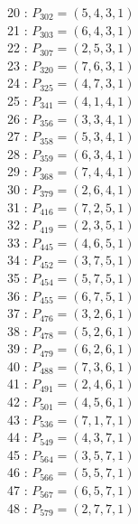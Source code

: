 \documentclass{article}
\begin{document}
{\begin{multicols}{2}
20 : $P_{302}=( 5, 4, 3, 1 )$\\
21 : $P_{303}=( 6, 4, 3, 1 )$\\
22 : $P_{307}=( 2, 5, 3, 1 )$\\
23 : $P_{320}=( 7, 6, 3, 1 )$\\
24 : $P_{325}=( 4, 7, 3, 1 )$\\
25 : $P_{341}=( 4, 1, 4, 1 )$\\
26 : $P_{356}=( 3, 3, 4, 1 )$\\
27 : $P_{358}=( 5, 3, 4, 1 )$\\
28 : $P_{359}=( 6, 3, 4, 1 )$\\
29 : $P_{368}=( 7, 4, 4, 1 )$\\
30 : $P_{379}=( 2, 6, 4, 1 )$\\
31 : $P_{416}=( 7, 2, 5, 1 )$\\
32 : $P_{419}=( 2, 3, 5, 1 )$\\
33 : $P_{445}=( 4, 6, 5, 1 )$\\
34 : $P_{452}=( 3, 7, 5, 1 )$\\
35 : $P_{454}=( 5, 7, 5, 1 )$\\
36 : $P_{455}=( 6, 7, 5, 1 )$\\
37 : $P_{476}=( 3, 2, 6, 1 )$\\
38 : $P_{478}=( 5, 2, 6, 1 )$\\
39 : $P_{479}=( 6, 2, 6, 1 )$\\
40 : $P_{488}=( 7, 3, 6, 1 )$\\
41 : $P_{491}=( 2, 4, 6, 1 )$\\
42 : $P_{501}=( 4, 5, 6, 1 )$\\
43 : $P_{536}=( 7, 1, 7, 1 )$\\
44 : $P_{549}=( 4, 3, 7, 1 )$\\
45 : $P_{564}=( 3, 5, 7, 1 )$\\
46 : $P_{566}=( 5, 5, 7, 1 )$\\
47 : $P_{567}=( 6, 5, 7, 1 )$\\
48 : $P_{579}=( 2, 7, 7, 1 )$\\
\end{multicols}
}
\end{document}
